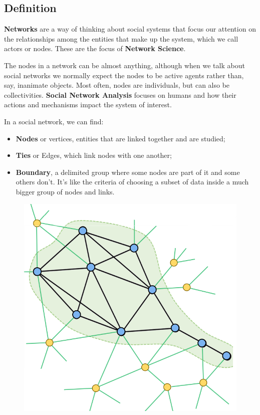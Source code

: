 \documentclass[
  notitlepage,
  onecolumn,
  openany]{book}
\providecommand{\tightlist}{%
  \setlength{\itemsep}{0pt}\setlength{\parskip}{0pt}}
\begin{document}
\hypertarget{definition}{%
\subsection{Definition}\label{definition}}

\textbf{Networks} are a way of thinking about social systems that focus our attention on the relationships among the entities that make up the system, which we call actors or nodes. These are the focus of \textbf{Network Science}.

The nodes in a network can be almost anything, although when we talk about social networks we normally expect the nodes to be active agents rather than, say, inanimate objects. Most often, nodes are individuals, but can also be collectivities. \textbf{Social Network Analysis} focuses on humans and how their actions and mechanisms impact the system of interest.

In a social network, we can find:

\begin{itemize}
\tightlist
\item
  \textbf{Nodes} or vertices, entities that are linked together and are studied;
\item
  \textbf{Ties} or Edges, which link nodes with one another;
\item
  \textbf{Boundary}, a delimited group where some nodes are part of it and some others don't. It's like the criteria of choosing a subset of data inside a much bigger group of nodes and links.
\end{itemize}

\begin{figure}[h!]

{\centering \includegraphics[width=0.5\linewidth]{images/01-Introduction/Untitled} 

}

\end{figure}
\end{document}
